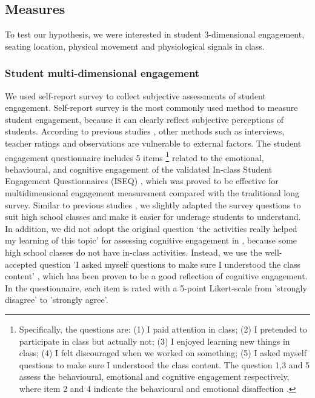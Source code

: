 \documentclass[sigconf]{acmart}
\begin{document}
\subsection{Measures}
To test our hypothesis, we were interested in student 3-dimensional engagement, seating location, physical movement and physiological signals in class. 

\subsubsection{Student multi-dimensional engagement} We used self-report survey to collect subjective assessments of student engagement. Self-report survey is the most commonly used method to measure student engagement, because it can clearly reflect subjective perceptions of students. According to previous studies \cite{fredricks2004school,fredricks2012measurement}, other methods such as interviews, teacher ratings and observations are vulnerable to external factors. The student engagement questionnaire includes 5 items \footnote{Specifically, the questions are: (1) I paid attention in class; (2) I pretended to participate in class but actually not; (3) I enjoyed learning new things in class; (4) I felt discouraged when we worked on something; (5) I asked myself questions to make sure I understood the class content. The question 1,3 and 5 assess the behavioural, emotional and cognitive engagement respectively, where item 2 and 4 indicate the
behavioural and emotional disaffection   \cite{fuller2018development,skinner2009motivational}.} related to the emotional, behavioural, and cognitive engagement of the validated In-class Student Engagement Questionnaires (ISEQ) \cite{fuller2018development}, which was proved to be effective for multidimensional engagement measurement compared with the traditional long survey. Similar to previous studies \cite{huynh2018engagemon,gashi2019using}, we slightly adapted the survey questions to suit high school classes and make it easier for underage students to understand. In addition, we did not adopt the original question ‘the activities really helped my learning of this topic’ for assessing cognitive engagement in \cite{fuller2018development}, because some high school classes do not have in-class activities. Instead, we use the well-accepted question ’I asked myself questions to make sure I understood the class content’ \cite{moore2006children}, which has been proven to be a good reflection of cognitive engagement. In the questionnaire, each item is rated with a 5-point Likert-scale from ’strongly disagree’ to ’strongly agree’.
\end{document}
